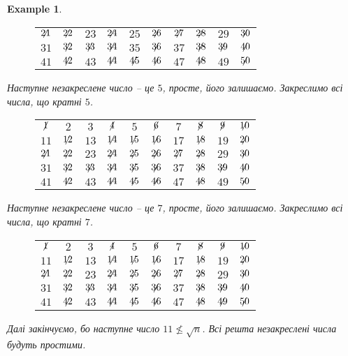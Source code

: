 \documentclass[a4paper, 14pt]{extarticle}
\theoremstyle{theoremdd}
\theoremstyle{theoremdd}
\theoremstyle{theoremdd}
\theoremstyle{theoremdd}
\newtheorem{example}[theorem]{Example}
\theoremstyle{theoremdd}
\theoremstyle{theoremdd}
\theoremstyle{theoremdd}
\theoremstyle{theoremdd}
\begin{document}
\begin{example}
\begin{figure}[H]
\begin{tabular}{cccccccccc}
$\centernot{21}$ & $\centernot{22}$ & $23$ & $\centernot{24}$ & $25$ & $\centernot{26}$ & $\centernot{27}$ & $\centernot{28}$ & $29$ & $\centernot{30}$ \\
$31$ & $\centernot{32}$ & $\centernot{33}$ & $\centernot{34}$ & $35$ & $\centernot{36}$ & $37$ & $\centernot{38}$ & $\centernot{39}$ & $\centernot{40}$ \\
$41$ & $\centernot{42}$ & $43$ & $\centernot{44}$ & $\centernot{45}$ & $\centernot{46}$ & $47$ & $\centernot{48}$ & $49$ & $\centernot{50}$
\end{tabular}
\end{figure}
Наступне незакреслене число -- це $5$, просте, його залишаємо. Закреслимо всі числа, що кратні $5$.
\begin{figure}[H]
\centering
\begin{tabular}{cccccccccc}
$\centernot{1}$ & $2$ & $3$ & $\centernot{4}$ & $5$ & $\centernot{6}$ & $7$ & $\centernot{8}$ & $\centernot{9}$ & $\centernot{10}$ \\
$11$ & $\centernot{12}$ & $13$ & $\centernot{14}$ & $\centernot{15}$ & $\centernot{16}$ & $17$ & $\centernot{18}$ & $19$ & $\centernot{20}$ \\
$\centernot{21}$ & $\centernot{22}$ & $23$ & $\centernot{24}$ & $\centernot{25}$ & $\centernot{26}$ & $\centernot{27}$ & $\centernot{28}$ & $29$ & $\centernot{30}$ \\
$31$ & $\centernot{32}$ & $\centernot{33}$ & $\centernot{34}$ & $\centernot{35}$ & $\centernot{36}$ & $37$ & $\centernot{38}$ & $\centernot{39}$ & $\centernot{40}$ \\
$41$ & $\centernot{42}$ & $43$ & $\centernot{44}$ & $\centernot{45}$ & $\centernot{46}$ & $47$ & $\centernot{48}$ & $49$ & $\centernot{50}$
\end{tabular}
\end{figure}
Наступне незакреслене число -- це $7$, просте, його залишаємо. Закреслимо всі числа, що кратні $7$.
\begin{figure}[H]
\centering
\begin{tabular}{cccccccccc}
$\centernot{1}$ & $2$ & $3$ & $\centernot{4}$ & $5$ & $\centernot{6}$ & $7$ & $\centernot{8}$ & $\centernot{9}$ & $\centernot{10}$ \\
$11$ & $\centernot{12}$ & $13$ & $\centernot{14}$ & $\centernot{15}$ & $\centernot{16}$ & $17$ & $\centernot{18}$ & $19$ & $\centernot{20}$ \\
$\centernot{21}$ & $\centernot{22}$ & $23$ & $\centernot{24}$ & $\centernot{25}$ & $\centernot{26}$ & $\centernot{27}$ & $\centernot{28}$ & $29$ & $\centernot{30}$ \\
$31$ & $\centernot{32}$ & $\centernot{33}$ & $\centernot{34}$ & $\centernot{35}$ & $\centernot{36}$ & $37$ & $\centernot{38}$ & $\centernot{39}$ & $\centernot{40}$ \\
$41$ & $\centernot{42}$ & $43$ & $\centernot{44}$ & $\centernot{45}$ & $\centernot{46}$ & $47$ & $\centernot{48}$ & $\centernot{49}$ & $\centernot{50}$
\end{tabular}
\end{figure}
Далі закінчуємо, бо наступне число $11 \not\leq \sqrt{n}$. Всі решта незакреслені числа будуть простими.
\end{example}
\end{document}

